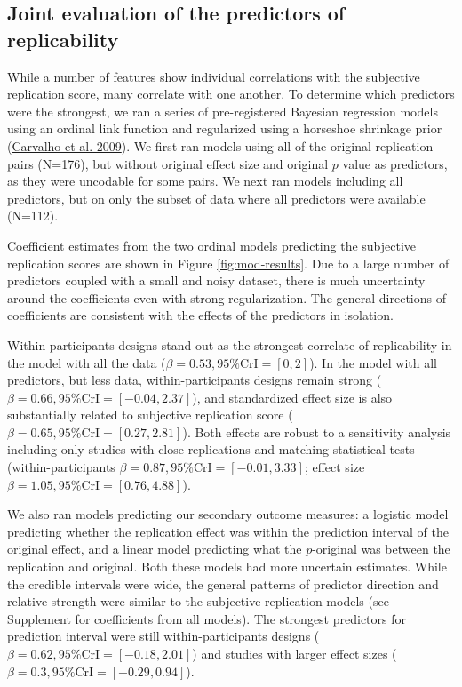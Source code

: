 \documentclass[
  english,
  a4paper,
]{article}
\begin{document}
\hypertarget{joint-evaluation-of-the-predictors-of-replicability}{%
\subsection{Joint evaluation of the predictors of replicability}\label{joint-evaluation-of-the-predictors-of-replicability}}

While a number of features show individual correlations with the subjective replication score, many correlate with one another. To determine which predictors were the strongest, we ran a series of pre-registered Bayesian regression models using an ordinal link function and regularized using a horseshoe shrinkage prior (\protect\hyperlink{ref-carvalho09}{Carvalho et al. 2009}). We first ran models using all of the original-replication pairs (N=176), but without original effect size and original \(p\) value as predictors, as they were uncodable for some pairs. We next ran models including all predictors, but on only the subset of data where all predictors were available (N=112).

Coefficient estimates from the two ordinal models predicting the subjective replication scores are shown in Figure \ref{fig:mod-results}. Due to a large number of predictors coupled with a small and noisy dataset, there is much uncertainty around the coefficients even with strong regularization. The general directions of coefficients are consistent with the effects of the predictors in isolation.

Within-participants designs stand out as the strongest correlate of replicability in the model with all the data (\(\beta = 0.53, 95\% \mathrm{CrI} = [0, 2]\)). In the model with all predictors, but less data, within-participants designs remain strong (\(\beta = 0.66, 95\% \mathrm{CrI} = [-0.04, 2.37]\)), and standardized effect size is also substantially related to subjective replication score (\(\beta = 0.65, 95\% \mathrm{CrI} = [0.27, 2.81]\)). Both effects are robust to a sensitivity analysis including only studies with close replications and matching statistical tests (within-participants \(\beta = 0.87, 95\% \mathrm{CrI} = [-0.01, 3.33]\); effect size \(\beta = 1.05, 95\% \mathrm{CrI} = [0.76, 4.88]\)).

We also ran models predicting our secondary outcome measures: a logistic model predicting whether the replication effect was within the prediction interval of the original effect, and a linear model predicting what the \(p\)-original was between the replication and original. Both these models had more uncertain estimates. While the credible intervals were wide, the general patterns of predictor direction and relative strength were similar to the subjective replication models (see Supplement for coefficients from all models). The strongest predictors for prediction interval were still within-participants designs (\(\beta = 0.62, 95\% \mathrm{CrI} = [-0.18, 2.01]\)) and studies with larger effect sizes (\(\beta = 0.3, 95\% \mathrm{CrI} = [-0.29, 0.94]\)).
\end{document}
